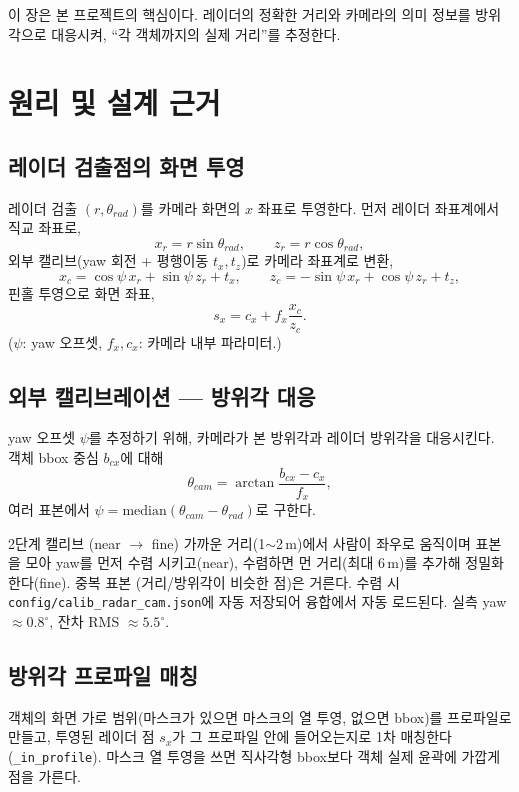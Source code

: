 \begin{statusdone}\end{statusdone}

이 장은 본 프로젝트의 핵심이다. 레이더의 정확한 거리와 카메라의 의미 정보를
방위각으로 대응시켜, ``각 객체까지의 실제 거리''를 추정한다.

\chapter{원리 및 설계 근거}

\section{레이더 검출점의 화면 투영}
레이더 검출 $(r, \theta_{rad})$를 카메라 화면의 $x$ 좌표로 투영한다. 먼저 레이더
좌표계에서 직교 좌표로,
\[
  x_r = r\sin\theta_{rad},\qquad z_r = r\cos\theta_{rad},
\]
외부 캘리브(yaw 회전 + 평행이동 $t_x, t_z$)로 카메라 좌표계로 변환,
\[
  x_c = \cos\psi\, x_r + \sin\psi\, z_r + t_x,\qquad
  z_c = -\sin\psi\, x_r + \cos\psi\, z_r + t_z,
\]
핀홀 투영으로 화면 좌표,
\[
  s_x = c_x + f_x \frac{x_c}{z_c}.
\]
($\psi$: yaw 오프셋, $f_x, c_x$: 카메라 내부 파라미터.)

\section{외부 캘리브레이션 — 방위각 대응}
yaw 오프셋 $\psi$를 추정하기 위해, 카메라가 본 방위각과 레이더 방위각을 대응시킨다.
객체 bbox 중심 $b_{cx}$에 대해
\[
  \theta_{cam} = \arctan\!\frac{b_{cx}-c_x}{f_x},
\]
여러 표본에서 $\psi = \mathrm{median}(\theta_{cam}-\theta_{rad})$로 구한다.

\begin{designbox}{2단계 캘리브 (near $\to$ fine)}
가까운 거리(1$\sim$2\,m)에서 사람이 좌우로 움직이며 표본을 모아 yaw를 먼저 수렴
시키고(near), 수렴하면 먼 거리(최대 6\,m)를 추가해 정밀화한다(fine). 중복 표본
(거리/방위각이 비슷한 점)은 거른다. 수렴 시 \texttt{config/calib\_radar\_cam.json}에
자동 저장되어 융합에서 자동 로드된다. 실측 yaw $\approx 0.8^\circ$, 잔차 RMS
$\approx 5.5^\circ$.
\end{designbox}

\section{방위각 프로파일 매칭}
객체의 화면 가로 범위(마스크가 있으면 마스크의 열 투영, 없으면 bbox)를
프로파일로 만들고, 투영된 레이더 점 $s_x$가 그 프로파일 안에 들어오는지로 1차
매칭한다(\texttt{\_in\_profile}). 마스크 열 투영을 쓰면 직사각형 bbox보다 객체
실제 윤곽에 가깝게 점을 가른다.

